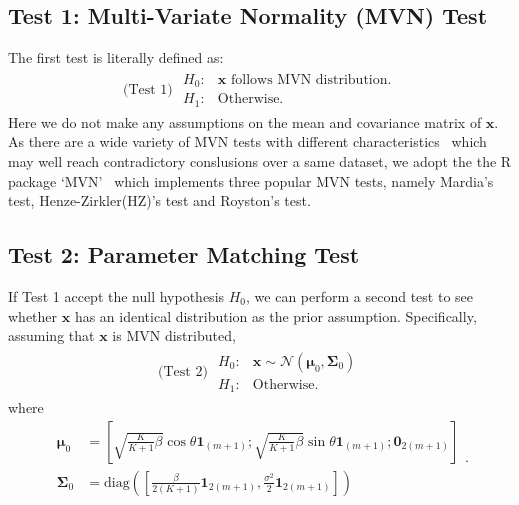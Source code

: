 \documentclass[journal,draftcls,onecolumn,12pt,twoside]{IEEEtran}
\begin{document}
\subsection{Test 1: Multi-Variate Normality (MVN) Test}
The first test is literally defined as:
\begin{align}
  \mbox{(Test 1) } \begin{array}{ll}H_0: & \mathbf{x}\mbox{ follows MVN
  distribution.} \\ H_1: & \mbox{Otherwise.} \end{array}
\end{align}
Here we do not make any assumptions on the mean and covariance matrix of
$\mathbf{x}$. As there are a wide variety of MVN tests with different
characteristics~\cite{mecklin2005monte} which may well reach contradictory
conslusions over a same dataset, we adopt the the R package
`MVN'~\cite{korkmaz2014mvn} which implements three popular MVN tests,
namely Mardia's test, Henze-Zirkler(HZ)'s test and Royston's test.

\subsection{Test 2: Parameter Matching Test}
If Test 1 accept the null hypothesis $H_0$, we can
perform a second test to see whether $\mathbf{x}$ has an identical distribution
as the prior assumption. Specifically, assuming that $\mathbf{x}$ is MVN
distributed,
\begin{align}
  \mbox{(Test 2) } \begin{array}{ll}H_0: & \mathbf{x}\sim
  \mathcal{N}(\bm{\mu}_0, \mathbf{\Sigma}_0) \\ H_1: &
  \mbox{Otherwise.}
  \end{array}
\end{align}
where
\begin{subequations}
  \begin{align}
    \bm{\mu}_0 & =
    \left[\sqrt{\frac{K}{K+1}\beta}\cos\theta\mathbf{1}_{(m+1)};
    \sqrt{\frac{K}{K+1}\beta}\sin\theta\mathbf{1}_{(m+1)};
    \mathbf{0}_{2(m+1)}\right]
    \\
    \mathbf{\Sigma}_0 & =
    \mbox{diag}\left(\left[\frac{\beta}{2(K+1)}\mathbf{1}_{2(m+1)},
    \frac{\sigma^2}{2}\mathbf{1}_{2(m+1)}\right]\right) 
  \end{align}.
  \label{eq:mu0Sigma0}
\end{subequations}
\end{document}
